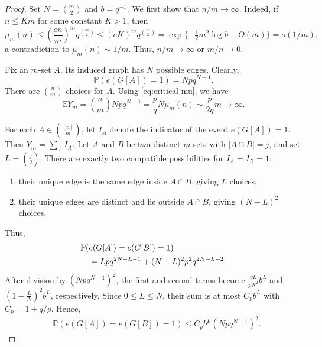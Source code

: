 \documentclass[11pt,reqno]{amsart}
\theoremstyle{definition}
\theoremstyle{remark}
\newcommand{\EE}{\mathbb E}
\newcommand{\PP}{\mathbb P}
\begin{document}
\begin{proof}
Set $N=\binom m2$ and $b=q^{-1}$. We first show that $n/m\to\infty$.  Indeed, if
 $n\le Km$ for some constant
$K>1$, then
\[
 \mu_m(n)\le\left(\frac{en}{m}\right)^m q^{\binom m2}
 \le(eK)^m q^{\binom m2}
 =\exp\{-\tfrac12m^2\log b+O(m)\}=o(1/m),
\]
a contradiction to $\mu_m(n)\sim1/m$. Thus, $n/m\to\infty$ or $m/n\to0$.






Fix an $m$-set $A$.  Its induced graph has $N$ possible edges.  Clearly,
\[
 \PP(e(G[A])=1)=Np q^{N-1}.
\]
There are $\binom nm$ choices for $A$. Using
\eqref{eq:critical-mu}, we have 
\begin{equation}\label{eq:EY}
 \EE Y_m
 =\binom nmNp q^{N-1}
 =\frac pqN\mu_m(n)
 \sim\frac{p}{2q}m\longrightarrow\infty.
\end{equation}


\smallskip

For each $A\in\binom{[n]}m$, let $I_A$ denote the indicator of the event
$e(G[A])=1$.
Then $Y_m=\sum_A I_A$.   Let $A$ and $B$ be two distinct $m$-sets with
$|A\cap B|=j$, and set $L=\binom j2$.  There are exactly two
compatible possibilities for $I_A=I_B=1$:
\begin{enumerate}[label=\textup{(\alph*)}]
 \item their unique edge is the same edge inside $A\cap B$, giving $L$ choices;
 \item their unique edges are distinct and lie outside $A\cap B$, giving $(N-L)^2$ choices.
\end{enumerate}
Thus,
\begin{align}
 &\PP(e(G[A])=e(G[B])=1)\notag\\
 &\quad=Lp q^{2N-L-1}+(N-L)^2p^2q^{2N-L-2}.
\end{align}
After division by $(Np q^{N-1})^2$, the first and second terms
become
$
 \frac{qL}{pN^2}b^L
 $ and
 $\left(1-\frac LN\right)^2b^L$, respectively.
Since $0\le L\le N$, their sum is at most
$C_p b^L$ with $C_p=1+q/p$. Hence,
\begin{align}
 &\PP(e(G[A])=e(G[B])=1)
 \leq C_p b^{L}(Np q^{N-1})^2.
\end{align}

\smallskip


\end{proof}
\end{document}
